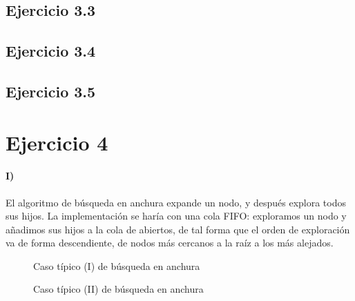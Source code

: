 \documentclass{aitemplate}
\begin{document}
\subsection*{Ejercicio 3.3}

\newpage
\subsection*{Ejercicio 3.4}

\newpage

\newpage
\subsection*{Ejercicio 3.5}

\newpage
%

\section*{Ejercicio 4}

\paragraph*{I)} El algoritmo de búsqueda en anchura expande un nodo, y después explora todos sus hijos. La implementación se haría con una cola FIFO: exploramos un nodo y añadimos sus hijos a la cola de abiertos, de tal forma que el orden de exploración va de forma descendiente, de nodos más cercanos a la raíz a los más alejados.

\begin{figure}[hbtp]
\centering
{}
\caption{Caso típico (I) de búsqueda en anchura}
\end{figure}

\begin{figure}[hbtp]
\centering
{}
\caption{Caso típico (II) de búsqueda en anchura}
\end{figure}
\end{document}
